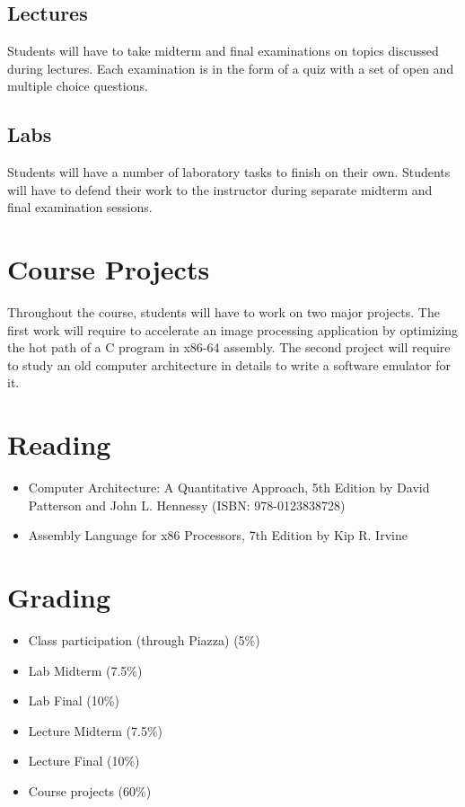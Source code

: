 \documentclass[12pt,a4paper,oneside]{article}
\begin{document}
        \subsection{Lectures}

            Students will have to take midterm and final examinations on topics
            discussed during lectures. Each examination is in the form of a quiz
            with a set of open and multiple choice questions.

        \subsection{Labs}

            Students will have a number of laboratory tasks to finish on their
            own. Students will have to defend their work to the instructor
            during separate midterm and final examination sessions.

    \section{Course Projects}

        Throughout the course, students will have to work on two major projects.
        The first work will require to accelerate an image processing
        application by optimizing the hot path of a C program in x86-64
        assembly. The second project will require to study an old computer
        architecture in details to write a software emulator for it.

    \section{Reading}

        \begin{itemize}
            \item Computer Architecture: A Quantitative Approach, 5th Edition by
            David Patterson and John L. Hennessy (ISBN: 978-0123838728)
            \item Assembly Language for x86 Processors, 7th Edition by Kip R.
            Irvine
        \end{itemize}

    \section{Grading}

        \begin{itemize}
            \item Class participation (through Piazza) (5\%)
            \item Lab Midterm (7.5\%)
            \item Lab Final (10\%)
            \item Lecture Midterm (7.5\%)
            \item Lecture Final (10\%)
            \item Course projects (60\%)
        \end{itemize}
\end{document}

